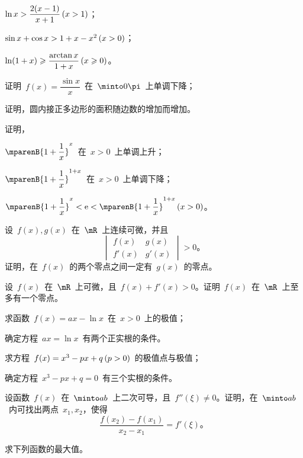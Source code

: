 \begin{exercise}
\begin{exlistcols}
  \item $\ln x>\dfrac{2(x-1)}{x+1}\mcond{x>1}$；
  \item $\sin x+\cos x>1+x-x^2\mcond{x>0}$；
  \item $\ln(1+x)\geq\dfrac{\arctan x}{1+x}\mcond{x\geq0}$。
\end{exlistcols}
\item\begin{exlist}
  \item 证明~$f(x)=\dfrac{\sin x}x$~在~$\minto 0\pi$~上单调下降；
  \item 证明，圆内接正多边形的面积随边数的增加而增加。
\end{exlist}
\item 证明，
\begin{exlistcols}
  \item $\mparenB{1+\dfrac1x}^x$~在~$x>0$~上单调上升；
  \item $\mparenB{1+\dfrac1x}^{1+x}$~在~$x>0$~上单调下降；
  \item $\mparenB{1+\dfrac1x}^x<\me<\mparenB{1+\dfrac1x}^{1+x}\mcond{x>0}$。
\end{exlistcols}
\item 设~$f(x),g(x)$~在~$\mR$~上连续可微，并且
\[
  \begin{vmatrix}
    f(x)  & g(x) \\
    f'(x) & g'(x)
  \end{vmatrix}>0 。
\]
证明，在~$f(x)$~的两个零点之间一定有~$g(x)$~的零点。
\item 设~$f(x)$~在~$\mR$~上可微，且~$f(x)+f'(x)>0$。证明~$f(x)$~在~$\mR$~上至多有一个零点。
\item\begin{exlist}
  \item 求函数~$f(x)=ax-\ln x$~在~$x>0$~上的极值；
  \item 确定方程~$ax=\ln x$~有两个正实根的条件。
\end{exlist}
\item\begin{exlist}
  \item 求方程~$f(x)=x^3-px+q\mcond{p>0}$~的极值点与极值；
  \item 确定方程~$x^3-px+q=0$~有三个实根的条件。
\end{exlist}
\item 设函数~$f(x)$~在~$\minto ab$~上二次可导，且~$f''(\xi)\neq0$。证明，在~$\minto ab$~内可找出两点~$x_1,x_2$，使得
\[
  \frac{f(x_2)-f(x_1)}{x_2-x_1}=f'(\xi)。
\]
\item 求下列函数的最大值。
\begin{exlistcols}

\end{exlistcols}
\end{exercise}
